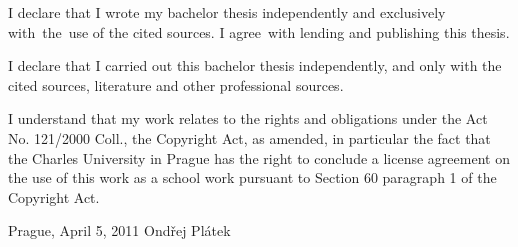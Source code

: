 \vspace{\fill} %
\noindent
I declare that I wrote my bachelor thesis independently and exclusively with~the~use of the cited sources. I agree~with lending and publishing this thesis.


\medskip\noindent
I declare that I carried out this bachelor thesis independently, and only with the cited
sources, literature and other professional sources.

I understand that my work relates to the rights and obligations under the Act No.
121/2000 Coll., the Copyright Act, as amended, in particular the fact that the Charles
University in Prague has the right to conclude a license agreement on the use of this
work as a school work pursuant to Section 60 paragraph 1 of the Copyright Act.

\noindent Prague, April 5, 2011 \hspace{\fill}Ondřej Plátek 


%

\newpage

